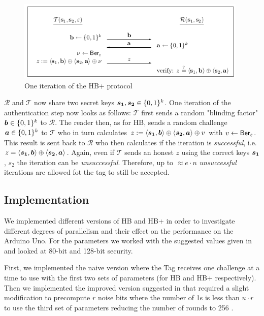 \documentclass[11pt,a4paper]{article}
\begin{document}
\begin{figure}[h]
	\includegraphics[width=11cm]{hbp}
	\centering
	\caption{One iteration of the HB+ protocol}
	\label{fig2}
\end{figure}

 $\mathcal{R}$ and $\mathcal{T}$ now share two secret keys $\boldsymbol{s_1}, \boldsymbol{s_2} \in \{0,1\}^k$. One iteration of the authentication step now looks as follows:
$\mathcal{T}$ first sends a random "blinding factor" $\boldsymbol{b} \in \{0,1\}^k$ to $\mathcal{R}$. The reader then, as for HB, sends a random challenge $\boldsymbol{a} \in \{0,1\}^k$ to $\mathcal{T}$ who in turn calculates $z:= \langle \boldsymbol{s_1}, \boldsymbol{b} \rangle \oplus \langle \boldsymbol{s_2}, \boldsymbol{a} \rangle \oplus v$ with $v \leftarrow \mathsf{Ber}_\varepsilon$.
This result is sent back to $\mathcal{R}$ who then calculates if the iteration is \textit{successful}, i.e. $z = \langle \boldsymbol{s_1}, \boldsymbol{b} \rangle \oplus \langle \boldsymbol{s_2}, \boldsymbol{a} \rangle$. 
Again, even if $\mathcal{T}$ sends an honest $z$ using the correct keys $\boldsymbol{s_1}$, $s_2$ the iteration can be \textit{unsuccessful}. Therefore, up to $\approx e \cdot n$ \textit{unsuccessful} iterations are allowed fot the tag to still be accepted.

\subsection{Implementation}

We implemented different versions of HB and HB+ in order to investigate different degrees of parallelism and their effect on the performance on the Arduino Uno. For the parameters we worked with the suggested values given in \cite{armknecht} and looked at 80-bit and 128-bit security.

First, we implemented the naive version where the Tag receives one challenge at a time to use with the first two sets of parameters (for HB and HB+ respectively). 
Then we implemented the improved version suggested in \cite{hbsharp} that required a slight modification to precompute $r$ noise bits where the number of 1s is less than $u \cdot r$ to use the third set of parameters reducing the number of rounds to 256 \cite{hbsharp}.
\end{document}
